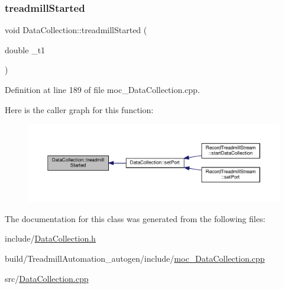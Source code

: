 \subsubsection{\texorpdfstring{treadmill\+Started}{treadmillStarted}}
{\footnotesize\ttfamily void Data\+Collection\+::treadmill\+Started (\begin{DoxyParamCaption}\item[{double}]{\+\_\+t1 }\end{DoxyParamCaption})\hspace{0.3cm}{\ttfamily [signal]}}



Definition at line 189 of file moc\+\_\+\+Data\+Collection.\+cpp.

Here is the caller graph for this function\+:
\nopagebreak
\begin{figure}[H]
\begin{center}
\leavevmode
\includegraphics[width=350pt]{class_data_collection_ab4f3954209cf3fb115ae074bff3f6977_icgraph}
\end{center}
\end{figure}


The documentation for this class was generated from the following files\+:\begin{DoxyCompactItemize}
\item 
include/\hyperlink{_data_collection_8h}{Data\+Collection.\+h}\item 
build/\+Treadmill\+Automation\+\_\+autogen/include/\hyperlink{moc___data_collection_8cpp}{moc\+\_\+\+Data\+Collection.\+cpp}\item 
src/\hyperlink{_data_collection_8cpp}{Data\+Collection.\+cpp}\end{DoxyCompactItemize}
